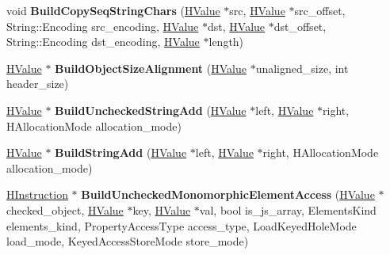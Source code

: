 \begin{DoxyCompactItemize}
\item 
\hypertarget{classv8_1_1internal_1_1_h_graph_builder_a91159ab1a4e2532eec8ac03e445fe25b}{}void {\bfseries Build\+Copy\+Seq\+String\+Chars} (\hyperlink{classv8_1_1internal_1_1_h_value}{H\+Value} $\ast$src, \hyperlink{classv8_1_1internal_1_1_h_value}{H\+Value} $\ast$src\+\_\+offset, String\+::\+Encoding src\+\_\+encoding, \hyperlink{classv8_1_1internal_1_1_h_value}{H\+Value} $\ast$dst, \hyperlink{classv8_1_1internal_1_1_h_value}{H\+Value} $\ast$dst\+\_\+offset, String\+::\+Encoding dst\+\_\+encoding, \hyperlink{classv8_1_1internal_1_1_h_value}{H\+Value} $\ast$length)\label{classv8_1_1internal_1_1_h_graph_builder_a91159ab1a4e2532eec8ac03e445fe25b}

\item 
\hypertarget{classv8_1_1internal_1_1_h_graph_builder_af1a7dd376d381910a4a2dd7b678c6aa7}{}\hyperlink{classv8_1_1internal_1_1_h_value}{H\+Value} $\ast$ {\bfseries Build\+Object\+Size\+Alignment} (\hyperlink{classv8_1_1internal_1_1_h_value}{H\+Value} $\ast$unaligned\+\_\+size, int header\+\_\+size)\label{classv8_1_1internal_1_1_h_graph_builder_af1a7dd376d381910a4a2dd7b678c6aa7}

\item 
\hypertarget{classv8_1_1internal_1_1_h_graph_builder_a9c72ba390fb67dd90f7692ae53a2450e}{}\hyperlink{classv8_1_1internal_1_1_h_value}{H\+Value} $\ast$ {\bfseries Build\+Unchecked\+String\+Add} (\hyperlink{classv8_1_1internal_1_1_h_value}{H\+Value} $\ast$left, \hyperlink{classv8_1_1internal_1_1_h_value}{H\+Value} $\ast$right, H\+Allocation\+Mode allocation\+\_\+mode)\label{classv8_1_1internal_1_1_h_graph_builder_a9c72ba390fb67dd90f7692ae53a2450e}

\item 
\hypertarget{classv8_1_1internal_1_1_h_graph_builder_a26637e3f31db967d94388cf6a5f3299e}{}\hyperlink{classv8_1_1internal_1_1_h_value}{H\+Value} $\ast$ {\bfseries Build\+String\+Add} (\hyperlink{classv8_1_1internal_1_1_h_value}{H\+Value} $\ast$left, \hyperlink{classv8_1_1internal_1_1_h_value}{H\+Value} $\ast$right, H\+Allocation\+Mode allocation\+\_\+mode)\label{classv8_1_1internal_1_1_h_graph_builder_a26637e3f31db967d94388cf6a5f3299e}

\item 
\hypertarget{classv8_1_1internal_1_1_h_graph_builder_a31349bacb6b418d80b13464205bc1c77}{}\hyperlink{classv8_1_1internal_1_1_h_instruction}{H\+Instruction} $\ast$ {\bfseries Build\+Unchecked\+Monomorphic\+Element\+Access} (\hyperlink{classv8_1_1internal_1_1_h_value}{H\+Value} $\ast$checked\+\_\+object, \hyperlink{classv8_1_1internal_1_1_h_value}{H\+Value} $\ast$key, \hyperlink{classv8_1_1internal_1_1_h_value}{H\+Value} $\ast$val, bool is\+\_\+js\+\_\+array, Elements\+Kind elements\+\_\+kind, Property\+Access\+Type access\+\_\+type, Load\+Keyed\+Hole\+Mode load\+\_\+mode, Keyed\+Access\+Store\+Mode store\+\_\+mode)\label{classv8_1_1internal_1_1_h_graph_builder_a31349bacb6b418d80b13464205bc1c77}


\end{DoxyCompactItemize}
